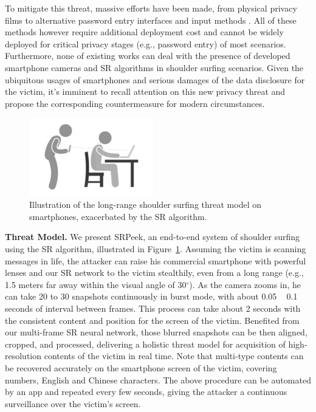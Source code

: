 
To mitigate this threat, massive efforts have been made, from physical privacy films to alternative password entry interfaces \cite{wiedenbeck2006design,papadopoulos2017illusionpin} and input methods \cite{kumar2007reducing}. All of these methods however require additional deployment cost \cite{Chun2019Keep} and cannot be widely deployed for critical privacy stages (e.g., password entry) of most scenarios. Furthermore, none of existing works can deal with the presence of developed smartphone cameras and SR algorithms in shoulder surfing scenarios. Given the ubiquitous usages of smartphones and serious damages of the data disclosure for the victim, it's imminent to recall attention on this new privacy threat and propose the corresponding countermeasure for modern circumstances.
\begin{figure}
	\centering
	\includegraphics[width=0.48\textwidth]{pic/intro.png}
    \caption{Illustration of the long-range shoulder surfing threat model on smartphones, exacerbated by the SR algorithm. }
	\label{illustration_of_system}
\end{figure}

\vspace{1mm}
\noindent
\textbf{Threat Model.} We present \textsf{SRPeek}, an end-to-end system of shoulder surfing using the SR algorithm, illustrated in Figure~\ref{illustration_of_system}. 
Assuming the victim is scanning messages in life, the attacker can raise his commercial smartphone with powerful lenses and our SR network to the victim stealthily, even from a long range (e.g., 1.5 meters far away within the visual angle of 30$^{\circ}$). As the camera zooms in, he can take 20 to 30 snapshots continuously in burst mode, with about 0.05 ~ 0.1 seconds of interval between frames. This process can take about 2 seconds with the consistent content and position for the screen of the victim. Benefited from our multi-frame SR neural network, those blurred snapshots can be then aligned, cropped, and processed, delivering a holistic threat model for acquisition of high-resolution contents of the victim in real time. Note that multi-type contents can be recovered accurately on the smartphone screen of the victim, covering numbers, English and Chinese characters. The above procedure can be automated by an app and repeated every few seconds, giving the attacker a continuous surveillance over the victim’s screen.

